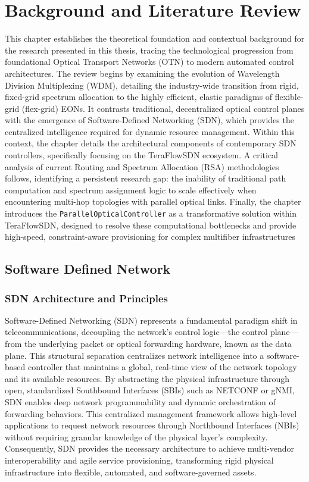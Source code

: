 \chapter{Background and Literature Review}
This chapter establishes the theoretical foundation and contextual background for the research presented in this thesis, tracing the technological progression from foundational Optical Transport Networks (OTN) to modern automated control architectures. The review begins by examining the evolution of Wavelength Division Multiplexing (WDM), detailing the industry-wide transition from rigid, fixed-grid spectrum allocation to the highly efficient, elastic paradigms of flexible-grid (flex-grid) EONs. It contrasts traditional, decentralized optical control planes with the emergence of Software-Defined Networking (SDN), which provides the centralized intelligence required for dynamic resource management. Within this context, the chapter details the architectural components of contemporary SDN controllers, specifically focusing on the TeraFlowSDN ecosystem. A critical analysis of current Routing and Spectrum Allocation (RSA) methodologies follows, identifying a persistent research gap: the inability of traditional path computation and spectrum assignment logic to scale effectively when encountering multi-hop topologies with parallel optical links. Finally, the chapter introduces the \texttt{ParallelOpticalController} as a transformative solution within TeraFlowSDN, designed to resolve these computational bottlenecks and provide high-speed, constraint-aware provisioning for complex multifiber infrastructures 
\section{Software Defined Network}
\subsection{SDN Architecture and Principles}
Software-Defined Networking (SDN) represents a fundamental paradigm shift in telecommunications, decoupling the network's control logic—the control plane—from the underlying packet or optical forwarding hardware, known as the data plane. This structural separation centralizes network intelligence into a software-based controller that maintains a global, real-time view of the network topology and its available resources. By abstracting the physical infrastructure through open, standardized Southbound Interfaces (SBIs) such as NETCONF or gNMI, SDN enables deep network programmability and dynamic orchestration of forwarding behaviors. This centralized management framework allows high-level applications to request network resources through Northbound Interfaces (NBIs) without requiring granular knowledge of the physical layer's complexity. Consequently, SDN provides the necessary architecture to achieve multi-vendor interoperability and agile service provisioning, transforming rigid physical infrastructure into flexible, automated, and software-governed assets.
